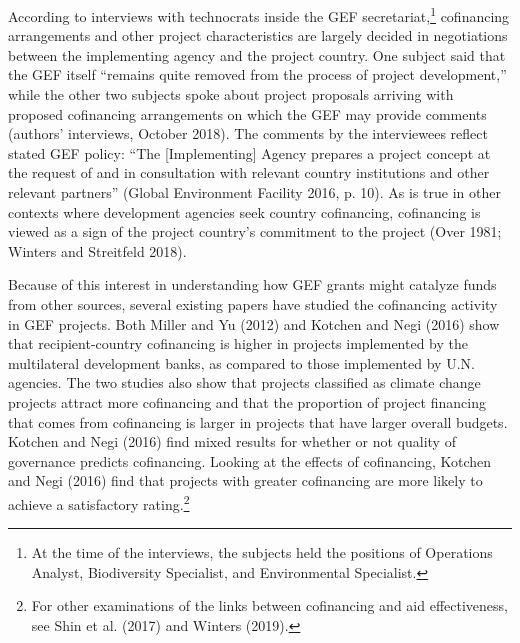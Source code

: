 \documentclass{article}
\begin{document}
According to interviews with technocrats inside the GEF secretariat,\footnote{At the time of the interviews, the subjects held the positions of Operations Analyst, Biodiversity Specialist, and Environmental Specialist.} cofinancing arrangements and other project characteristics are largely decided in negotiations between the implementing agency and the project country.  One subject said that the GEF itself “remains quite removed from the process of project development,” while the other two subjects spoke about project proposals arriving with proposed cofinancing arrangements on which the GEF may provide comments (authors’ interviews, October 2018).  The comments by the interviewees reflect stated GEF policy: “The [Implementing] Agency prepares a project concept at the request of and in consultation with relevant country institutions and other relevant partners” (Global Environment Facility 2016, p. 10).  As is true in other contexts where development agencies seek country cofinancing, cofinancing is viewed as a sign of the project country’s commitment to the project (Over 1981; Winters and Streitfeld 2018).

Because of this interest in understanding how GEF grants might catalyze funds from other sources, several existing papers have studied the cofinancing activity in GEF projects.  Both Miller and Yu (2012) and Kotchen and Negi (2016) show that recipient-country cofinancing is higher in projects implemented by the multilateral development banks, as compared to those implemented by U.N. agencies.  The two studies also show that projects classified as climate change projects attract more cofinancing and that the proportion of project financing that comes from cofinancing is larger in projects that have larger overall budgets.  Kotchen and Negi (2016) find mixed results for whether or not quality of governance predicts cofinancing.  Looking at the effects of cofinancing, Kotchen and Negi (2016) find that projects with greater cofinancing are more likely to achieve a satisfactory rating.\footnote{For other examinations of the links between cofinancing and aid effectiveness, see Shin et al. (2017) and Winters (2019).} 
\end{document}
